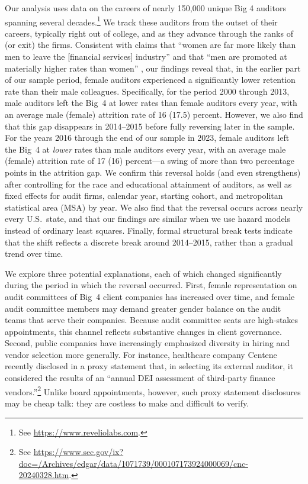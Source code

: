 \documentclass[11pt]{article}
\begin{document}
    Our analysis uses data on the careers of nearly 150,000 unique Big 4 auditors spanning several decades.\footnote{See \url{https://www.reveliolabs.com}.} We track these auditors from the outset of their careers, typically right out of college, and as they advance through the ranks of (or exit) the firms. Consistent with claims that ``women are far more likely than men to leave the [financial services] industry'' and that ``men are promoted at materially higher rates than women'' \parencite{jaekelWhyWomenArent2016}, our findings reveal that, in the earlier part of our sample period, female auditors experienced a significantly lower retention rate than their male colleagues. Specifically, for the period 2000 through 2013, male auditors left the Big~4 at lower rates than female auditors every year, with an average male (female) attrition rate of 16 (17.5) percent. However, we also find that this gap disappears in 2014--2015 before fully reversing later in the sample. For the years 2016 through the end of our sample in 2023, female auditors left the Big~4 at \textit{lower} rates than male auditors every year, with an average male (female) attrition rate of 17 (16) percent---a swing of more than two percentage points in the attrition gap. We confirm this reversal holds (and even strengthens) after controlling for the race and educational attainment of auditors, as well as fixed effects for audit firms, calendar year, starting cohort, and metropolitan statistical area (MSA) by year. We also find that the reversal occurs across nearly every U.S.\ state, and that our findings are similar when we use hazard models instead of ordinary least squares. Finally, formal structural break tests indicate that the shift reflects a discrete break around 2014--2015, rather than a gradual trend over time.

    We explore three potential explanations, each of which changed significantly during the period in which the reversal occurred. First, female representation on audit committees of Big~4 client companies has increased over time, and female audit committee members may demand greater gender balance on the audit teams that serve their companies. Because audit committee seats are high-stakes appointments, this channel reflects substantive changes in client governance. Second, public companies have increasingly emphasized diversity in hiring and vendor selection more generally. For instance, healthcare company Centene recently disclosed in a proxy statement that, in selecting its external auditor, it considered the results of an ``annual DEI assessment of third-party finance vendors.''\footnote{See \url{https://www.sec.gov/ix?doc=/Archives/edgar/data/1071739/000107173924000069/cnc-20240328.htm}.} Unlike board appointments, however, such proxy statement disclosures may be cheap talk: they are costless to make and difficult to verify. 
    
\end{document}
